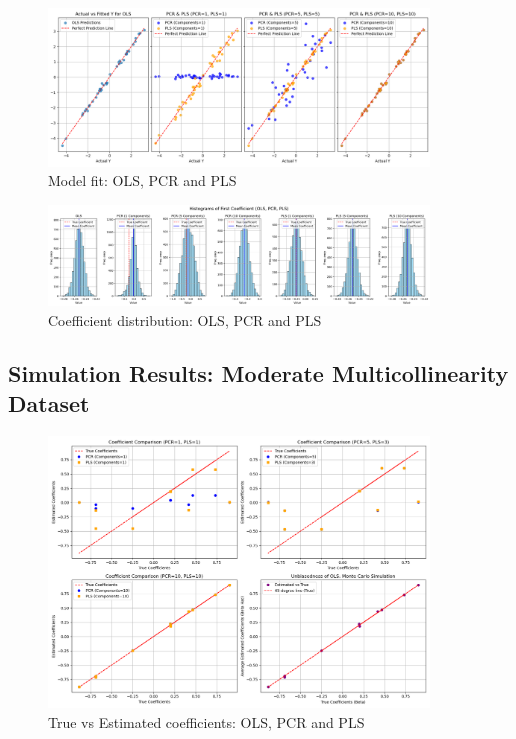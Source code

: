 \documentclass[11pt,twoside,a4paper]{article}
\begin{document}
\begin{figure}[H]
    \centering
    \includegraphics[width=0.9\textwidth]{Third_plot.png}
    \caption{Model fit: OLS, PCR and PLS}
    \label{fig:Classic_data_analysis}
\end{figure}

\begin{figure}[H]
    \centering
    \includegraphics[width=0.9\textwidth]{Fourth_plot.png}
    \caption{Coefficient distribution: OLS, PCR and PLS}
    \label{fig:Classic_data_analysis}
\end{figure}

\subsection{Simulation Results: Moderate Multicollinearity Dataset}

\begin{figure}[H]
    \centering
    \includegraphics[width=0.9\textwidth]{First_plot_second_simulation.png}
    \caption{True vs Estimated coefficients: OLS, PCR and PLS}
    \label{fig:Moderate_multicollinear_data_analysis}
\end{figure}
\end{document}
